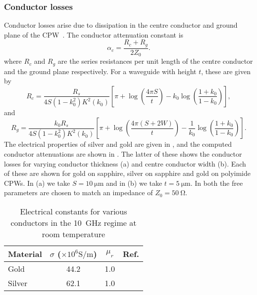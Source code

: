 \subsubsection{Conductor losses}

Conductor losses arise due to dissipation in the centre conductor and ground
plane of the CPW~\cite{Simons2004}.  The conductor attenuation constant is
%
\begin{equation}
  \alpha_c = \frac{R_c +R_g}{2Z_0}.
\end{equation}
%
where $R_c$ and $R_g$ are the series resistances per unit length of the centre
conductor and the ground plane respectively.
%
For a waveguide with height $t$, these are given by
%
\begin{equation}
  R_c = \frac{R_s}{4 S(1-k_0^2)K^2(k_0)}\left[ \pi + \log\left(\frac{4\pi
  S}{t}\right) - k_0\log\left(\frac{1+k_0}{1-k_0}\right) \right],
\end{equation}
%
and
%
\begin{equation}
  R_g = \frac{k_0 R_s}{4S(1-k_0^2)K^2(k_0)}\left[\pi +
  \log\left(\frac{4\pi(S+2W)}{t}\right) -
  \frac{1}{k_0}\log\left(\frac{1+k_0}{1-k_0}\right)\right].
\end{equation}
%
The electrical properties of silver and gold are given in
, and the computed conductor attenuations are
shown in . The latter of these shows the
conductor losses for varying conductor thickness (a) and centre conductor width
(b). Each of these are shown for gold on sapphire, silver on sapphire and gold
on polyimide CPWs. In (a) we take $S=\SI{10}{\micro\meter}$ and in (b) we take
$t=\SI{5}{\micro\meter}$. In both the free parameters are chosen to match an
impedance of $Z_0=\SI{50}{\ohm}$.

% 
\begin{table}[tb!]
  \caption[Various electrical constants]{Electrical constants for various conductors in the
  \SI{10}{\giga\hertz} regime at room temperature}
\centering
\begin{tabular}{l c c c}
\hline\hline
Material & $\sigma$ ($\times10^6\si{\siemens\per\meter}$) & $\mu_r$ & Ref. \\ [ 0.5ex]
\hline
  Gold & 44.2 & 1.0 & \cite{edwards2016foundations}\\
  Silver & 62.1 & 1.0 & \cite{edwards2016foundations}\\
\hline
\end{tabular}
\label{mws:table:metalprops}
\end{table}

